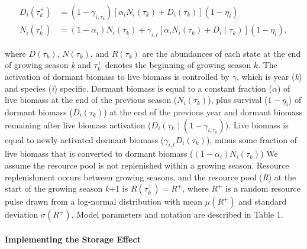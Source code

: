 \documentclass[12pt,]{article}
\begin{document}
\begin{align}
  D_{i}(\tau_k^+) &= (1-\gamma_{i,\tau_k})[\alpha_i N_{i}(\tau_k) + D_{i}(\tau_k)](1-\eta_i) \\
  N_{i}(\tau_k^+) &= (1-\alpha_i)N_{i}(\tau_k) + \gamma_{i,t}[\alpha_i N_{i}(\tau_k) + D_{i}(\tau_k)] (1-\eta_i),
\end{align}\vspace{-3em}

\noindent where \(D(\tau_k)\), \(N(\tau_k)\), and \(R(\tau_k)\) are the
abundances of each state at the end of growing season \emph{k} and
\(\tau_k^+\) denotes the beginning of growing season \(k\). The
activation of dormant biomass to live biomass is controlled by
\(\gamma\), which is year (\emph{k}) and species (\emph{i}) specific.
Dormant biomass is equal to a constant fraction (\(\alpha\)) of live
biomass at the end of the previous season (\(N_{i}(\tau_k)\)), plus
survival (\(1-\eta_i\)) of dormant biomass (\(D_{i}(\tau_k)\)) at the
end of the previous year and dormant biomass remaining after live
biomass activation (\(D_{i}(\tau_k)(1-\gamma_{i,\tau_k})\)). Live
biomass is equal to newly activated dormant biomass
(\(\gamma_{i,t}D_{i}(\tau_k)\)), minus some fraction of live biomass
that is converted to dormant biomass (\((1-\alpha_i)N_{i}(\tau_k)\)) We
assume the resource pool is not replenished within a growing season.
Resource replenishment occurs between growing seasons, and the resource
pool (\emph{R}) at the start of the growing season \emph{k}+1 is
\(R(\tau_k^+) = R^+\), where \(R^+\) is a random resource pulse drawn
from a log-normal distribution with mean \(\mu(R^+)\) and standard
deviation \(\sigma(R^+)\). Model parameters and notation are described
in Table 1.

\paragraph{Implementing the Storage
Effect}\label{implementing-the-storage-effect}
\end{document}
